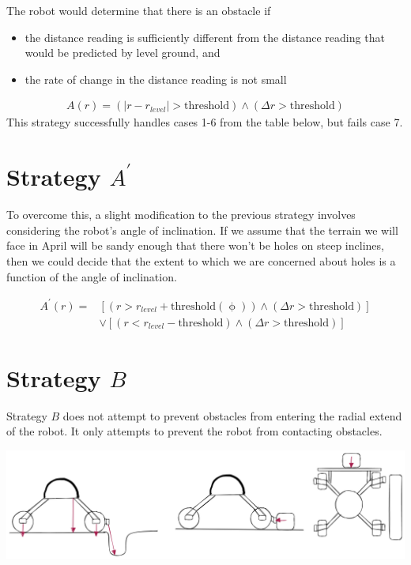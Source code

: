 \documentclass[letterpaper]{article}
\begin{document}
The robot would determine that there is an obstacle if
\begin{itemize}
\item the distance reading is sufficiently different from the distance reading that would be predicted by level ground, and
\item the rate of change in the distance reading is not small
\end{itemize}
\begin{align*}
A(r) = \left( \lvert r - r_{level} \rvert > \mathrm{threshold} \right) \land \left( \Delta r > \mathrm{threshold} \right)
\end{align*}
This strategy successfully handles cases 1-6 from the table below, but fails case 7.

\section*{Strategy \(A^{'}\)}
\label{sec:org0ba3cd9}
To overcome this, a slight modification to the previous strategy involves considering the robot's angle of inclination. If we assume that the terrain we will face in April will be sandy enough that there won't be holes on steep inclines, then we could decide that the extent to which we are concerned about holes is a function of the angle of inclination.

\begin{align*}
A^{'}(r) = & \left[ \left( r > r_{level} + \mathrm{threshold(\upphi)} \right) \land \left( \Delta r > \mathrm{threshold} \right) \right] \\
& \lor \left[ \left( r < r_{level} - \mathrm{threshold} \right) \land \left( \Delta r > \mathrm{threshold} \right) \right]
\end{align*}

\section*{Strategy \(B\)}
\label{sec:org64a08c5}
Strategy \(B\) does not attempt to prevent obstacles from entering the radial extend of the robot. It only attempts to prevent the robot from contacting obstacles.

\begin{center}
\includegraphics[width=.9\linewidth]{./strategy-b.png}
\end{center}
\end{document}
